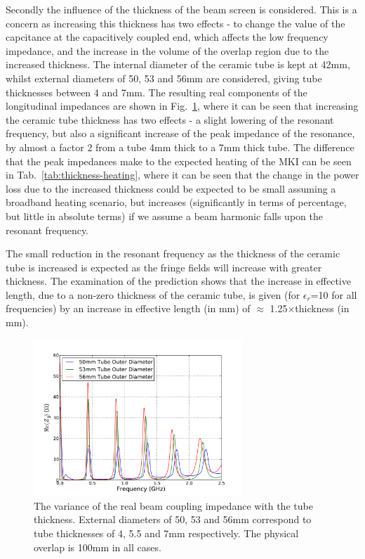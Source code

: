 Secondly the influence of the thickness of the beam screen is considered. This is a concern as increasing this thickness has two effects - to change the value of the capcitance at the capacitively coupled end, which affects the low frequency impedance, and the increase in the volume of the overlap region due to the increased thickness. The internal diameter of the ceramic tube is kept at 42mm, whilst external diameters of 50, 53 and 56mm are considered, giving tube thicknesses between 4 and 7mm. The resulting real components of the longitudinal impedances are shown in Fig.~\ref{fig:tube-thickness-imp}, where it can be seen that increasing the ceramic tube thickness has two effects - a slight lowering of the resonant frequency, but also a significant increase of the peak impedance of the resonance, by almost a factor 2 from a tube 4mm thick to a 7mm thick tube. The difference that the peak impedances make to the expected heating of the MKI can be seen in Tab.~\ref{tab:thickness-heating}, where it can be seen that the change in the power loss due to the increased thickness could be expected to be small assuming a broadband heating scenario, but increases (significantly in terms of percentage, but little in absolute terms) if we assume a beam harmonic falls upon the resonant frequency.

The small reduction in the resonant frequency as the thickness of the ceramic tube is increased is expected as the fringe fields will increase with greater thickness. The examination of the prediction shows that the increase in effective length, due to a non-zero thickness of the ceramic tube, is given (for $\epsilon_{r}$=10 for all frequencies) by an increase in effective length (in mm) of $\approx$ 1.25$\times$thickness (in mm).

\begin{figure}
\begin{center}
\includegraphics[width=0.7\textwidth]{LHC_MKI/figures/mki-tube-thickness-real.pdf}
\end{center}
\caption{The variance of the real beam coupling impedance with the tube thickness. External diameters of 50, 53 and 56mm correspond to tube thicknesses of 4, 5.5 and 7mm respectively. The physical overlap is 100mm in all cases.}
\label{fig:tube-thickness-imp}
\end{figure}

